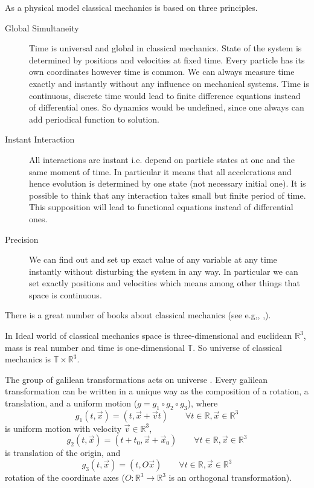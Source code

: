 As a physical model classical mechanics is based on three principles.
\begin{description}
  \item[ Global Simultaneity] 
    Time is universal and global in classical mechanics. State of the system is determined by
    positions and velocities at fixed time. Every particle has its own coordinates however time
    is common. We can always measure time  exactly and instantly without any influence 
    on mechanical systems. Time is continuous, discrete time would lead to finite difference
    equations instead of differential ones. So dynamics would be undefined, since one always can
    add periodical function to solution.
  \item[ Instant Interaction]
    All interactions are instant i.e. depend on particle states at one and the same moment of time.
    In particular it means that all accelerations and hence evolution is determined by one state (not necessary initial one). It is possible to think that any interaction takes small but finite period of time. This supposition will lead to functional equations instead of differential ones.
  \item [ Precision]
    We can find out and set up exact value of any variable at any time instantly without disturbing
    the system in any way. In particular we can set exactly positions and velocities which means 
    among other things that space is continuous.
\end{description}

There is a great number of books about classical mechanics 
(see e.g\cite{Arnold-cm},\cite{Landau-Lifshitz-1},
\cite{Lanczos},\cite{Goldstein}). 

In Ideal world of classical mechanics space is three-dimensional  and euclidean
$\mathbb{R}^3$, mass is real number and time is one-dimensional $\mathbb{T}$.
So universe of classical mechanics is $\mathbb{T} \times \mathbb{R}^3$. 

 The  group of galilean transformations acts on universe \cite{Arnold-cm}. 
Every galilean transformation can be written in a unique way as the composition of a rotation, a translation,
and a uniform motion ($g = g_1 \circ g_2 \circ g_3$), where
\[g_1(t,\vec x)=(t,\vec x+\vec v t)\qquad \forall t\in \mathbb{R},\vec x \in\mathbb{R}^3\] is uniform motion with velocity $\vec v \in\mathbb{R}^3$,
\[g_2(t,\vec x)=(t+t_0,\vec x+\vec x_0)\qquad \forall t\in \mathbb{R},\vec x \in\mathbb{R}^3\] is translation of the origin, and
\[g_3(t,\vec x)=(t,O\vec x)\qquad \forall t\in \mathbb{R},\vec x \in\mathbb{R}^3\] rotation of the coordinate axes ($O:\mathbb{R}^3 \rightarrow \mathbb{R}^3$ is an orthogonal transformation).

